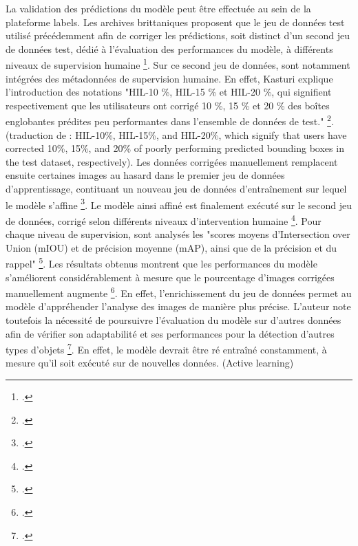 La validation des prédictions du modèle peut être effectuée au sein de la plateforme \gls{labels}. Les archives brittaniques proposent que le jeu de données test utilisé précédemment afin de corriger les prédictions, soit distinct d'un second jeu de données test, dédié à l'évaluation des performances du modèle, à différents niveaux de supervision humaine \footcite{kasturi2024}. Sur ce second jeu de données, sont notamment intégrées des métadonnées de supervision humaine. En effet, Kasturi explique l'introduction des notations "HIL-10 \%, HIL-15 \% et HIL-20 \%, qui signifient respectivement que les utilisateurs ont corrigé 10 \%, 15 \% et 20 \% des boîtes englobantes prédites peu performantes dans l’ensemble de données de test." \footcite{kasturi2024}. (traduction de :  HIL-10\%, HIL-15\%, and HIL-20\%, which signify that users have corrected 10\%, 15\%, and 20\% of poorly performing predicted bounding boxes in the test dataset, respectively). Les données corrigées manuellement remplacent ensuite certaines images au hasard dans le premier jeu de données d'apprentissage, contituant un nouveau jeu de données d'entraînement sur lequel le modèle s'affine \footcite{kasturi2024}. 
Le modèle ainsi affiné est finalement exécuté sur le second jeu de données, corrigé selon différents niveaux d'intervention humaine \footcite{kasturi2024}. Pour chaque niveau de supervision, sont analysés les "scores moyens d’Intersection over Union (mIOU) et de précision moyenne (mAP), ainsi que de la précision et du rappel" \footcite{kasturi2024}. 
Les résultats obtenus montrent que les performances du modèle s'améliorent considérablement à mesure que le pourcentage d'images corrigées manuellement augmente \footcite{kasturi2024}. En effet, l'enrichissement du jeu de données permet au modèle d'appréhender l'analyse des images de manière plus précise. L'auteur note toutefois la nécessité de poursuivre l'évaluation du modèle sur d'autres données afin de vérifier son adaptabilité et ses performances pour la détection d'autres types d'objets \footcite{kasturi2024}. En effet, le modèle devrait être ré entraîné constamment, à mesure qu'il soit exécuté sur de nouvelles données. (Active learning)


